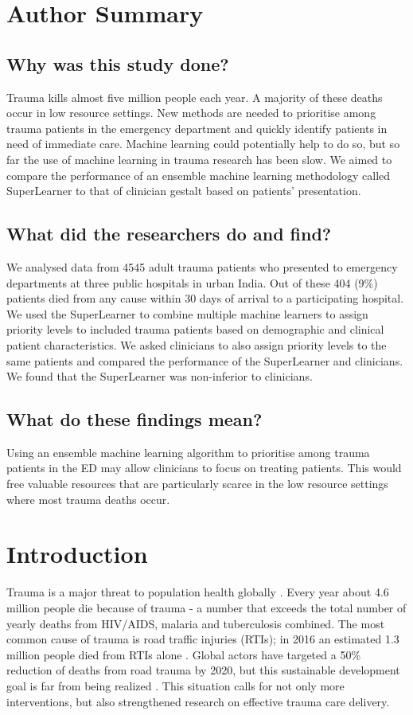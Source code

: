 \documentclass[10pt,letterpaper]{article}\usepackage[]{graphicx}\usepackage[]{color}
\begin{document}
\section*{Author Summary}
\subsection*{Why was this study done?}
Trauma kills almost five million people each year. A majority of these deaths
occur in low resource settings. New methods are needed to prioritise among
trauma patients in the emergency department and quickly identify patients in
need of immediate care. Machine learning could potentially help to do so, but so
far the use of machine learning in trauma research has been slow. We aimed to
compare the performance of an ensemble machine learning methodology called
SuperLearner to that of clinician gestalt based on patients’ presentation.

\subsection*{What did the researchers do and find?}
We analysed data from 4545 adult trauma
patients who presented to emergency departments at three public hospitals in
urban India. Out of these 404 (9\%) patients died from any
cause within 30 days of arrival to a participating hospital. We used the
SuperLearner to combine multiple machine learners to assign priority levels to
included trauma patients based on demographic and clinical patient
characteristics. We asked clinicians to also assign priority levels to the same
patients and compared the performance of the SuperLearner and clinicians. We
found that the SuperLearner was non-inferior to clinicians.

\subsection*{What do these findings mean?}
Using an ensemble machine learning algorithm to prioritise among trauma patients
in the ED may allow clinicians to focus on treating patients. This would free
valuable resources that are particularly scarce in the low resource settings
where most trauma deaths occur.

\linenumbers

\section*{Introduction}
Trauma is a major threat to population health globally
\cite{Brohi2017,GBD2017}. Every year about 4.6 million people die because of
trauma - a number that exceeds the total number of yearly deaths from HIV/AIDS,
malaria and tuberculosis combined. The most common cause of trauma is road
traffic injuries (RTIs); in 2016 an estimated 1.3 million people died from RTIs
alone \cite{GBD2017}. Global actors have targeted a 50\% reduction of deaths
from road trauma by 2020, but this sustainable development goal is far from
being realized \cite{UN2018}. This situation calls for not only more
interventions, but also strengthened research on effective trauma care delivery.
\end{document}
